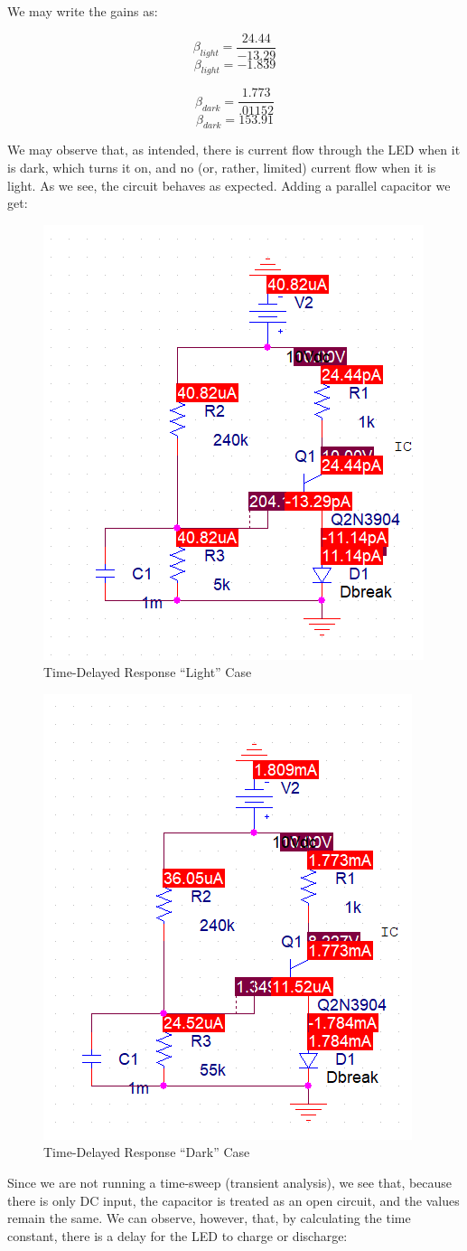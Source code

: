 \documentclass[
	letterpaper, %
	10pt, %
]{CSUniSchoolLabReport}
\begin{document}
We may write the gains as:

$$\beta_{light}=\frac{24.44}{-13.29}$$
$$\boxed{\beta_{light}=-1.839}$$

$$\beta_{dark}=\frac{1.773}{.01152}$$
$$\boxed{\beta_{dark}=153.91}$$

We may observe that, as intended, there is current flow through the LED when it is dark, which turns it on, and no (or, rather, limited) current flow when it is light. As we see, the circuit behaves as expected. Adding a parallel capacitor we get:

\begin{figure}[H]
  \centering
  \includegraphics[width=.4\textwidth]{Figures/L3F9}
  \caption{Time-Delayed Response ``Light'' Case}
  \label{fig:13}
\end{figure}

\begin{figure}[H]
  \centering
  \includegraphics[width=.4\textwidth]{Figures/L3F10}
  \caption{Time-Delayed Response ``Dark'' Case}
  \label{fig:14}
\end{figure}

Since we are not running a time-sweep (transient analysis), we see that, because there is only DC input, the capacitor is treated as an open circuit, and the values remain the same. We can observe, however, that, by calculating the time constant, there is a delay for the LED to charge or discharge:
\end{document}
